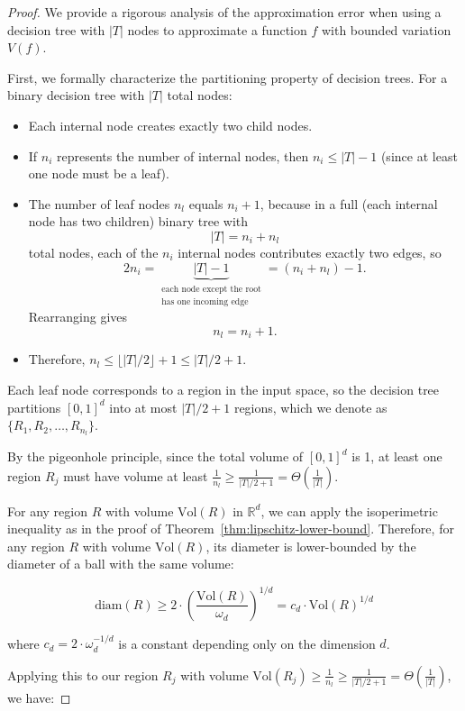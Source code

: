 \documentclass[11pt,letter,leqno]{article}
\begin{document}
\begin{proof}
We provide a rigorous analysis of the approximation error when using a decision tree with $|T|$ nodes to approximate a function $f$ with bounded variation $V(f)$.

First, we formally characterize the partitioning property of decision trees.  For a binary decision tree with $|T|$ total nodes:
\begin{itemize}
\item Each internal node creates exactly two child nodes.
\item If $n_i$ represents the number of internal nodes, then $n_i \leq |T| - 1$ (since at least one node must be a leaf).
\item The number of leaf nodes $n_l$ equals $n_i + 1$, because in a full (each internal node has two children) binary tree with 
\[
|T| = n_i + n_l
\]
total nodes, each of the \(n_i\) internal nodes contributes exactly two edges, so
\[
2n_i = \underbrace{|T|-1}_{\substack{\text{each node except the root}\\\text{has one incoming edge}}}
= (n_i + n_l) - 1.
\]
Rearranging gives
\[
n_l = n_i + 1.
\]
\item Therefore, $n_l \leq \lfloor|T|/2\rfloor + 1 \leq |T|/2 + 1$.
\end{itemize}

Each leaf node corresponds to a region in the input space, so the decision tree partitions $[0,1]^d$ into at most $|T|/2 + 1$ regions, which we denote as $\{R_1, R_2, \ldots, R_{n_l}\}$.

By the pigeonhole principle, since the total volume of $[0,1]^d$ is 1, at least one region $R_j$ must have volume at least $\frac{1}{n_l} \geq \frac{1}{|T|/2 + 1} = \Theta\left(\frac{1}{|T|}\right)$.

For any region $R$ with volume $\text{Vol}(R)$ in $\mathbb{R}^d$, we can apply the isoperimetric inequality as in the proof of Theorem~\ref{thm:lipschitz-lower-bound}.  Therefore, for any region $R$ with volume $\text{Vol}(R)$, its diameter is lower-bounded by the diameter of a ball with the same volume:

$$\text{diam}(R) \geq 2 \cdot \left(\frac{\text{Vol}(R)}{\omega_d}\right)^{1/d} = c_d \cdot \text{Vol}(R)^{1/d}$$

where $c_d = 2 \cdot \omega_d^{-1/d}$ is a constant depending only on the dimension $d$.

Applying this to our region $R_j$ with volume $\text{Vol}(R_j) \geq \frac{1}{n_l} \geq \frac{1}{|T|/2+1} = \Theta\left(\frac{1}{|T|}\right)$, we have:


\end{proof}
\end{document}
